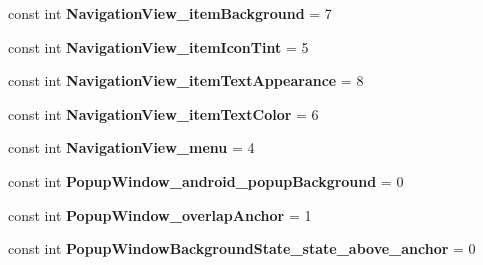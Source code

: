 \begin{DoxyCompactItemize}
\mbox{\label{class_pinned_app_1_1_droid_1_1_resource_1_1_styleable_a21bdae60842100bf601ad1492189308c}} 
const int {\bfseries Navigation\+View\+\_\+item\+Background} = 7
\item 
\mbox{\label{class_pinned_app_1_1_droid_1_1_resource_1_1_styleable_aed4030d8525f5e7fffc9b22ead11207a}} 
const int {\bfseries Navigation\+View\+\_\+item\+Icon\+Tint} = 5
\item 
\mbox{\label{class_pinned_app_1_1_droid_1_1_resource_1_1_styleable_a37bc00f6b28035dc603ac8bbc9c1a8e7}} 
const int {\bfseries Navigation\+View\+\_\+item\+Text\+Appearance} = 8
\item 
\mbox{\label{class_pinned_app_1_1_droid_1_1_resource_1_1_styleable_a76823c7a36faad2b2f79ff90043225bf}} 
const int {\bfseries Navigation\+View\+\_\+item\+Text\+Color} = 6
\item 
\mbox{\label{class_pinned_app_1_1_droid_1_1_resource_1_1_styleable_aa3858e4507544c28a89b27719c3f49d9}} 
const int {\bfseries Navigation\+View\+\_\+menu} = 4
\item 
\mbox{\label{class_pinned_app_1_1_droid_1_1_resource_1_1_styleable_ada4d27fa0ef316325504216eb00d8445}} 
const int {\bfseries Popup\+Window\+\_\+android\+\_\+popup\+Background} = 0
\item 
\mbox{\label{class_pinned_app_1_1_droid_1_1_resource_1_1_styleable_ae10c6e42a649fd4ca62aa5e4eeedfa3a}} 
const int {\bfseries Popup\+Window\+\_\+overlap\+Anchor} = 1
\item 
\mbox{\label{class_pinned_app_1_1_droid_1_1_resource_1_1_styleable_afdff3e779f6b3bc9e46f84cd64428583}} 
const int {\bfseries Popup\+Window\+Background\+State\+\_\+state\+\_\+above\+\_\+anchor} = 0
\item 
\mbox{\label{class_pinned_app_1_1_droid_1_1_resource_1_1_styleable_aad518e794f0278a690fd3397d4abdbad}} 

\end{DoxyCompactItemize}
